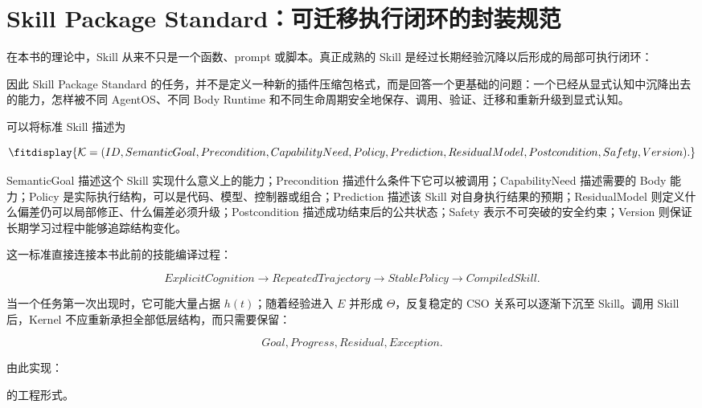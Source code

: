 \section{Skill Package Standard：可迁移执行闭环的封装规范}

在本书的理论中，Skill 从来不只是一个函数、prompt 或脚本。真正成熟的 Skill 是经过长期经验沉降以后形成的局部可执行闭环：

\begin{statementbox}
\centering
{}
\end{statementbox}

因此 Skill Package Standard 的任务，并不是定义一种新的插件压缩包格式，而是回答一个更基础的问题：一个已经从显式认知中沉降出去的能力，怎样被不同 AgentOS、不同 Body Runtime 和不同生命周期安全地保存、调用、验证、迁移和重新升级到显式认知。

可以将标准 Skill 描述为

\[
\fitdisplay{
\mathcal K
=
(
ID,
SemanticGoal,
Precondition,
CapabilityNeed,
Policy,
Prediction,
ResidualModel,
Postcondition,
Safety,
Version
).
}
\]

SemanticGoal 描述这个 Skill 实现什么意义上的能力；Precondition 描述什么条件下它可以被调用；CapabilityNeed 描述需要的 Body 能力；Policy 是实际执行结构，可以是代码、模型、控制器或组合；Prediction 描述该 Skill 对自身执行结果的预期；ResidualModel 则定义什么偏差仍可以局部修正、什么偏差必须升级；Postcondition 描述成功结束后的公共状态；Safety 表示不可突破的安全约束；Version 则保证长期学习过程中能够追踪结构变化。

这一标准直接连接本书此前的技能编译过程：

\[
ExplicitCognition
\rightarrow
RepeatedTrajectory
\rightarrow
StablePolicy
\rightarrow
CompiledSkill.
\]

当一个任务第一次出现时，它可能大量占据 $h(t)$；随着经验进入 $E$ 并形成 $\Theta$，反复稳定的 CSO 关系可以逐渐下沉至 Skill。调用 Skill 后，Kernel 不应重新承担全部低层结构，而只需要保留：

\[
Goal,
Progress,
Residual,
Exception.
\]

由此实现：

\begin{statementbox}
\centering
{}
\end{statementbox}

的工程形式。

